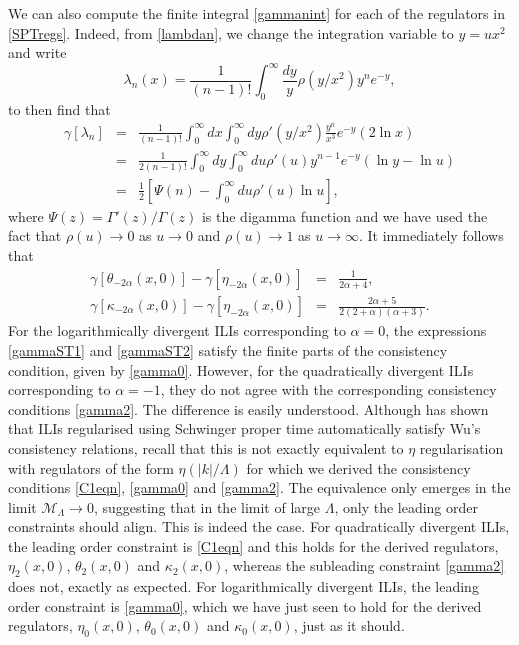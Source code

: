 \documentclass[11pt, letter]{article}
\def\be{\begin{equation}}
\def\ee{\end{equation}}
\newcommand{\M}{\mathcal{M}}
\begin{document}
We can also compute the finite integral \eqref{gammanint} for each of the regulators  in \eqref{SPTregs}.  Indeed, from \eqref{lambdan}, we change the integration variable to $y=ux^2$ and write 
\be
\lambda_n(x)=\frac{1}{(n-1)!}\int_0^\infty \frac{dy}{y}  \rho(y/x^2)  y^{n} e^{-y},
\ee
to  then find that 
\begin{eqnarray}
\gamma[\lambda_n]&=&\frac{1}{(n-1)!}  \int_0^\infty  dx \int_0^\infty dy   \rho'(y/x^2)  \frac{y^{n}}{x^3} e^{-y} (2 \ln x) \\
&=& \frac{1}{2(n-1)!}     \int_0^\infty dy  \int_0^\infty  du   \rho'(u)  y^{n-1} e^{-y} ( \ln y-\ln u)  \\
& =& \frac{1}{2} \left[\Psi(n) - \int_0^\infty du \rho'(u) \ln u \right], 
\end{eqnarray}
where $\Psi(z)=\Gamma'(z)/\Gamma(z)$ is the digamma function and we have used the fact that  $\rho(u) \to 0$  as $u\to 0$ and $\rho(u) \to 1$ as $u \to \infty$. It immediately follows that 
\begin{eqnarray}
\gamma[\theta_{-2\alpha}(x, 0)]-\gamma[\eta_{-2\alpha}(x, 0)]&=&\frac{1}{2\alpha+4} \label{gammaST1},\\
\gamma[\kappa_{-2\alpha}(x, 0)]-\gamma[\eta_{-2\alpha}(x, 0)]&=&\frac{2 \alpha +5}{2 \left(2+\alpha \right) \left(\alpha +3\right)}. \label{gammaST2}
\end{eqnarray}
For the logarithmically divergent ILIs corresponding to $\alpha=0$, the expressions \eqref{gammaST1} and \eqref{gammaST2} satisfy the finite parts of the consistency condition, given by  \eqref{gamma0}. However, for the quadratically divergent ILIs corresponding to $\alpha=-1$, they do not agree with the corresponding consistency conditions \eqref{gamma2}. The difference is easily understood.  Although \cite{Xing:2022jtt}  has shown that  ILIs regularised using Schwinger proper time automatically satisfy Wu's consistency relations, recall that this is not exactly equivalent to $\eta$ regularisation with regulators of the form $\eta(|k|/\Lambda)$ for which we derived the consistency conditions \eqref{C1eqn},  \eqref{gamma0} and \eqref{gamma2}. The equivalence only emerges in the limit $\M_\Lambda \to 0$, suggesting that in the limit of large $\Lambda$, only the leading order constraints should align. This is indeed the case. For quadratically divergent ILIs, the leading order constraint is \eqref{C1eqn} and this holds for the derived regulators, $\eta_{2}(x, 0)$, $\theta_{2}(x, 0)$ and $\kappa_{2}(x, 0)$, whereas the subleading constraint \eqref{gamma2} does not, exactly as expected.  For logarithmically divergent ILIs,  the leading order constraint is \eqref{gamma0}, which  we have just seen to hold for the derived regulators, $\eta_{0}(x, 0)$, $\theta_{0}(x, 0)$ and $\kappa_{0}(x, 0)$, just as it should. 
\end{document}
